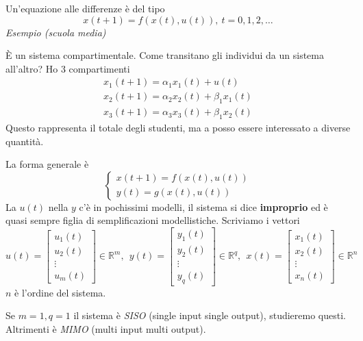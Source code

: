 Un'equazione alle differenze è del tipo
\begin{equation*}
	x(t+1) =f(x(t) ,u(t)) ,\ t=0,1,2,\dotsc 
\end{equation*}
\textit{Esempio (scuola media)}

È un sistema compartimentale. Come transitano gli individui da un sistema all'altro? Ho 3 compartimenti
\begin{equation*}
	\begin{array}{ l }
		x_1 (t+1)=\alpha _1 x_1 (t)+u(t)             \\
		x_2 (t+1)=\alpha _2 x_2 (t)+\beta _1 x_1 (t) \\
		x_3 (t+1)=\alpha _3 x_3 (t)+\beta _1 x_2 (t) 
	\end{array}
\end{equation*}
Questo rappresenta il totale degli studenti, ma a posso essere interessato a diverse quantità.

La forma generale è
\begin{equation*}
	\boxed{
		\begin{cases}
			x(t+1)=f(x(t),u(t)) \\
			y(t)=g(x(t),u(t))  
		\end{cases}
	}
\end{equation*}
La $u(t)$ nella $y$ c'è in pochissimi modelli, il sistema si dice \textbf{improprio} ed è quasi sempre figlia di semplificazioni modellistiche.
Scriviamo i vettori
\begin{equation*}
	u(t)=\begin{bmatrix}
	u_1 (t)\\
	u_2 (t)\\
	\vdots \\
	u_m (t)
	\end{bmatrix} \in \mathbb{R}^m ,\ \ y(t)=\begin{bmatrix}
	y_1 (t)\\
	y_2 (t)\\
	\vdots \\
	y_q (t)
	\end{bmatrix} \in \mathbb{R}^q ,\ \ x(t)=\begin{bmatrix}
	x_1 (t)\\
	x_2 (t)\\
	\vdots \\
	x_n (t)
	\end{bmatrix} \in \mathbb{R}^n
\end{equation*}
$n$ è l'ordine del sistema.

Se $m=1,q=1$ il sistema è \textit{SISO} (single input single output), studieremo questi. Altrimenti è \textit{MIMO} (multi input multi output).

